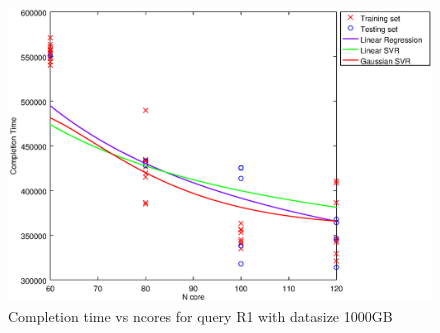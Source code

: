 
\begin {figure}[hbtp]
\centering
\includegraphics[width=\textwidth]{output/R1_1000_1_OVER_NCORES/plot_R1_1000_bestmodels.eps}
\caption{Completion time vs ncores for query R1 with datasize 1000GB}
\label{fig:all_nonlinear_R1_1000}
\end {figure}
